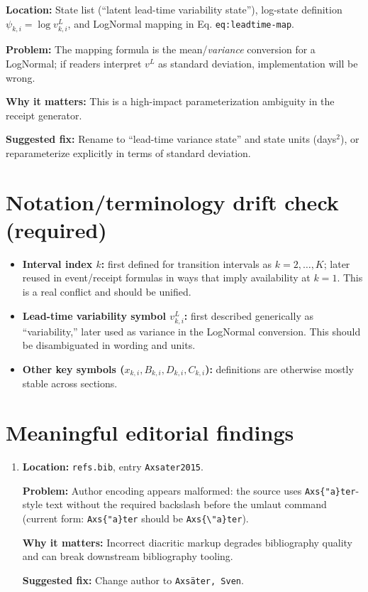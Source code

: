 \documentclass[11pt]{article}
\begin{document}
\begin{enumerate}
  \textbf{Location:} State list (``latent lead-time variability state''), log-state definition $\psi_{k,i}=\log v^L_{k,i}$, and LogNormal mapping in Eq. \texttt{eq:leadtime-map}.

  \textbf{Problem:} The mapping formula is the mean/\emph{variance} conversion for a LogNormal; if readers interpret $v^L$ as standard deviation, implementation will be wrong.

  \textbf{Why it matters:} This is a high-impact parameterization ambiguity in the receipt generator.

  \textbf{Suggested fix:} Rename to ``lead-time variance state'' and state units (days$^2$), or reparameterize explicitly in terms of standard deviation.
\end{enumerate}

\section*{Notation/terminology drift check (required)}

\begin{itemize}
  \item \textbf{Interval index $k$:} first defined for transition intervals as $k=2,\dots,K$; later reused in event/receipt formulas in ways that imply availability at $k=1$. This is a real conflict and should be unified.
  \item \textbf{Lead-time variability symbol $v^L_{k,i}$:} first described generically as ``variability,'' later used as variance in the LogNormal conversion. This should be disambiguated in wording and units.
  \item \textbf{Other key symbols ($x_{k,i}, B_{k,i}, D_{k,i}, C_{k,i}$):} definitions are otherwise mostly stable across sections.
\end{itemize}

\section*{Meaningful editorial findings}

\begin{enumerate}
  \item \textbf{Location:} \texttt{refs.bib}, entry \texttt{Axsater2015}.

  \textbf{Problem:} Author encoding appears malformed: the source uses \verb|Axs{"a}ter|-style text without the required backslash before the umlaut command (current form: \verb|Axs{"a}ter| should be \verb|Axs{\"a}ter|).

  \textbf{Why it matters:} Incorrect diacritic markup degrades bibliography quality and can break downstream bibliography tooling.

  \textbf{Suggested fix:} Change author to \texttt{Axs{\"a}ter, Sven}.
\end{enumerate}
\end{document}
